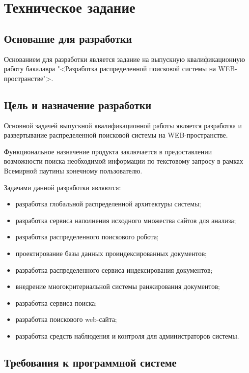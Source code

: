 \newsection
\section{Техническое задание}
\subsection{Основание для разработки}

Основанием для разработки является задание на выпускную квалификационную работу бакалавра "<Разработка распределенной поисковой системы на WEB-пространстве">.

\subsection{Цель и назначение разработки}

Основной задачей выпускной квалификационной работы является разработка и развертывание распределенной поисковой системы на WEB-пространстве.

Функциональное назначение продукта заключается в предоставлении возможности поиска необходимой информации по текстовому запросу в рамках Всемирной паутины конечному пользователю.

Задачами данной разработки являются:
\begin{itemize}
\item разработка глобальной распределенной архитектуры системы;
\item разработка сервиса наполнения исходного множества сайтов для анализа;
\item разработка распределенного поискового робота;
\item проектирование базы данных проиндексированных документов;
\item разработка распределенного сервиса индексирования документов;
\item внедрение многокритериальной системы ранжирования документов;
\item разработка сервиса поиска;
\item разработка поискового web-сайта;
\item разработка средств наблюдения и контроля для администраторов системы.
\end{itemize}

\subsection{Требования к программной системе}

